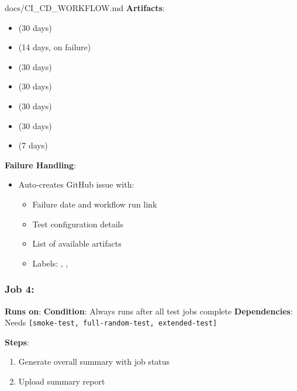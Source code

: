 \begin{relocated}{docs/CI_CD_WORKFLOW.md}
\textbf{Artifacts}:

\begin{itemize}
\tightlist
\item
   (30 days)
\item
   (14 days, on failure)
\item
   (30 days)
\item
   (30 days)
\item
   (30 days)
\item
   (30 days)
\item
   (7 days)
\end{itemize}

\textbf{Failure Handling}:

\begin{itemize}
\tightlist
\item
  Auto-creates GitHub issue with:

  \begin{itemize}
  \tightlist
  \item
    Failure date and workflow run link
  \item
    Test configuration details
  \item
    List of available artifacts
  \item
    Labels: , , 
  \end{itemize}
\end{itemize}

\subsubsection{\texorpdfstring{Job 4: }{Job 4: }}\label{um:flow:ci-cd-workflow:job-4-summary-report}

\textbf{Runs on}:  \textbf{Condition}: Always runs
after all test jobs complete \textbf{Dependencies}: Needs
\texttt{[smoke-\allowbreak{}test,\allowbreak{}\ full-\allowbreak{}random-\allowbreak{}test,\allowbreak{}\ extended-\allowbreak{}test]}

\textbf{Steps}:

\begin{enumerate}
\def\labelenumi{\arabic{enumi}.}
\tightlist
\item
  Generate overall summary with job status
\item
  Upload summary report
\end{enumerate}


\end{relocated}
